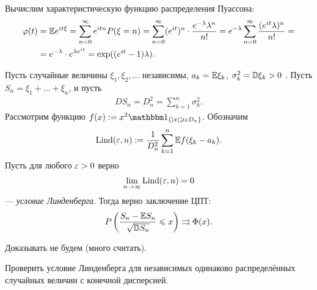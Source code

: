 \documentclass[../main.tex]{subfiles}
\begin{document}
\begin{remrk*}
 Вычислим характеристическую функцию распределения Пуассона:
 \begin{align*}
  \varphi(t) &= \mathbb E e^{it\xi} = \sum_{n=0}^{\infty} e^{itn} P(\xi = n) = \sum_{n=0}^{\infty} (e^{it})^{n} \cdot \frac{e^{-\lambda} \lambda^{n}}{n!} = e^{-\lambda} \sum_{n = 0}^{\infty} \frac{(e^{it}\lambda)^{n}}{n!} = \\
  &= e^{-\lambda} \cdot e^{\lambda e^{it}} = \exp((e^{it} - 1)\lambda).
 \end{align*}
\end{remrk*}

\begin{thm}
 Пусть случайные величины $ \xi_1, \xi_2, \ldots $  независимы, $ a_k = \mathbb E \xi_k $,  $ \sigma_k^{2} = \mathbb D \xi_k > 0 $ . Пусть $ S_n = \xi_1 + \ldots + \xi_n $, и пусть
 \begin{align*}
  DS_n = D_n^{2} = \sum_{k=1}^{n} \sigma_k^{2}.
 \end{align*} Рассмотрим функцию $ f(x) := x^{2} \Ind_{\left\{ \left| x \right| \geqslant \eps D_n \right\}} $. Обозначим
 \begin{align*}
  \mathrm{Lind}(\varepsilon, n) := \frac{1}{D_n^{2}} \sum_{k=1}^{n} \mathbb E f(\xi_k - a_k).
 \end{align*} Пусть для любого $ \varepsilon > 0 $ верно
 \begin{align*}
  \lim_{n \to \infty} \mathrm{Lind}(\varepsilon, n) = 0
 \end{align*} --- \textit{условие Линденберга}. Тогда верно заключение ЦПТ:
 \begin{align*}
  P \left( \frac{S_n - \mathbb E S_n}{\sqrt{\mathbb D S_n}} \leqslant x \right) \rightrightarrows \Phi(x).
 \end{align*}
\end{thm}

Доказывать не будем (много считать).

\begin{exercs*}
 Проверить условие Линденберга для независимых одинаково распределённых случайных величин с конечной дисперсией.
\end{exercs*}
\end{document}
